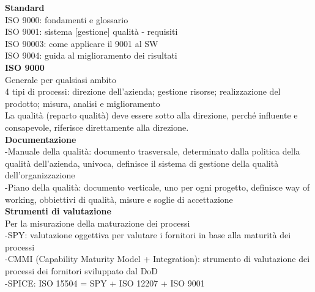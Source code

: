 \documentclass{article}
\begin{document}
		\textbf{Standard}\\
		ISO 9000: fondamenti e glossario\\
		ISO 9001: sistema [gestione] qualità - requisiti\\
		ISO 90003: come applicare il 9001 al SW\\
		ISO 9004: guida al miglioramento dei risultati\\
		
		\textbf{ISO 9000}\\
		Generale per qualsiasi ambito\\
		4 tipi di processi: direzione dell'azienda; gestione risorse; realizzazione del prodotto; misura, analisi e miglioramento\\
		La qualità (reparto qualità) deve essere sotto alla direzione, perché influente e consapevole, riferisce direttamente alla direzione.\\
		
		\textbf{Documentazione}\\
		-Manuale della qualità: documento trasversale, determinato dalla politica della qualità dell'azienda, univoca, definisce il sistema di gestione della qualità dell'organizzazione\\
		-Piano della qualità: documento verticale, uno per ogni progetto, definisce way of working, obbiettivi di qualità, misure e soglie di accettazione\\
		
		\textbf{Strumenti di valutazione}\\
		Per la misurazione della maturazione dei processi\\
		-SPY: valutazione oggettiva per valutare i fornitori in base alla maturità dei processi\\
		-CMMI (Capability Maturity Model + Integration): strumento di valutazione dei processi dei fornitori sviluppato dal DoD\\
		-SPICE: ISO 15504 = SPY + ISO 12207 + ISO 9001\\
		
		
\end{document}
